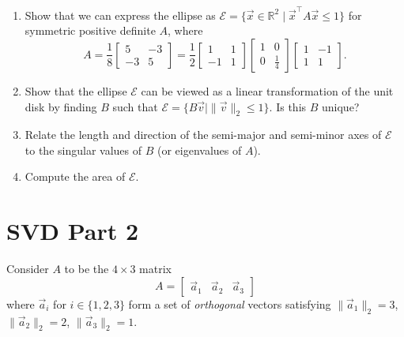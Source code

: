 \documentclass[10pt]{article}
\theoremstyle{definition}
\theoremstyle{plain}
\newcommand{\RR}{\mathbb{R}}
\begin{document}
\begin{enumerate}[label=(\alph*)]
\item Show that we can express the ellipse as $\mathcal{E} = \{\vec{x} \in \RR^2 \mid \vec{x}^\top A \vec{x} \leq 1\}$ for symmetric positive definite $A$, where
\begin{equation}
A = \frac{1}{8} \begin{bmatrix} 5 & -3 \\ -3 & 5 \end{bmatrix} = \frac{1}{2} \begin{bmatrix} 1 & 1 \\ -1 & 1 \end{bmatrix} \begin{bmatrix} 1 & 0 \\ 0 & \frac{1}{4} \end{bmatrix} \begin{bmatrix} 1 & -1 \\ 1 & 1 \end{bmatrix}.
\end{equation}

\item Show that the ellipse $\mathcal{E}$ can be viewed as a linear transformation of the unit disk by finding $B$ such that $\mathcal{E} = \{B\vec{v} \mid \|\vec{v}\|_2 \leq 1\}$. Is this $B$ unique?

\item Relate the length and direction of the semi-major and semi-minor axes of $\mathcal{E}$ to the singular values of $B$ (or eigenvalues of $A$).

\item Compute the area of $\mathcal{E}$.
\end{enumerate}

\section{SVD Part 2}

Consider $A$ to be the $4 \times 3$ matrix
\begin{equation}
A = \begin{bmatrix} \vec{a}_1 & \vec{a}_2 & \vec{a}_3 \end{bmatrix}
\end{equation}
where $\vec{a}_i$ for $i \in \{1, 2, 3\}$ form a set of \textit{orthogonal} vectors satisfying $\|\vec{a}_1\|_2 = 3$, $\|\vec{a}_2\|_2 = 2$, $\|\vec{a}_3\|_2 = 1$.
\end{document}
